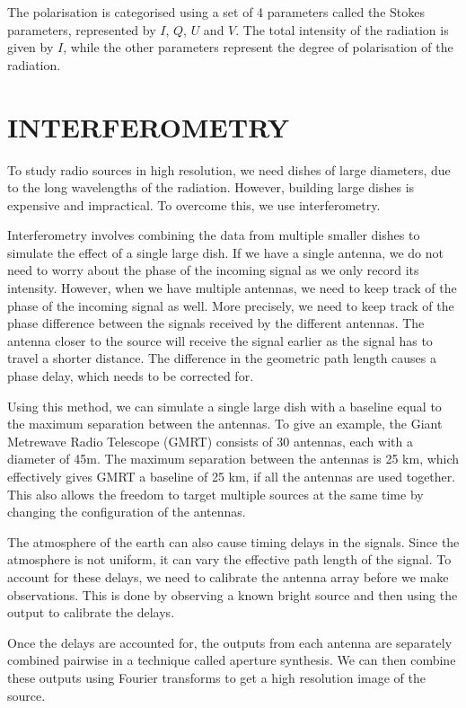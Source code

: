 \documentclass{article_saj}
\begin{document}
The polarisation is categorised using a set of 4 parameters called the Stokes parameters, represented by $I$, $Q$, $U$ and $V$. The total intensity of the radiation is given by $I$, while the other parameters represent the degree of polarisation of the radiation. 


\section{INTERFEROMETRY}
To study radio sources in high resolution, we need dishes of large diameters, due to the long wavelengths of the radiation. However, building large dishes is expensive and impractical. To overcome this, we use interferometry.

Interferometry involves combining the data from multiple smaller dishes to simulate the effect of a single large dish. If we have a single antenna, we do not need to worry about the phase of the incoming signal as we only record its intensity. However, when we have multiple antennas, we need to keep track of the phase of the incoming signal as well. More precisely, we need to keep track of the phase difference between the signals received by the different antennas. The antenna closer to the source will receive the signal earlier as the signal has to travel a shorter distance. The difference in the geometric path length causes a phase delay, which needs to be corrected for.

Using this method, we can simulate a single large dish with a baseline equal to the maximum separation between the antennas. To give an example, the Giant Metrewave Radio Telescope (GMRT) consists of 30 antennas, each with a diameter of 45m. The maximum separation between the antennas is 25 km, which effectively gives GMRT a baseline of 25 km, if all the antennas are used together. This also allows the freedom to target multiple sources at the same time by changing the configuration of the antennas.

The atmosphere of the earth can also cause timing delays in the signals. Since the atmosphere is not uniform, it can vary the effective path length of the signal. To account for these delays, we need to calibrate the antenna array before we make observations. This is done by observing a known bright source and then using the output to calibrate the delays.

Once the delays are accounted for, the outputs from each antenna are separately combined pairwise in a technique called aperture synthesis. We can then combine these outputs using Fourier transforms to get a high resolution image of the source.
\end{document}
